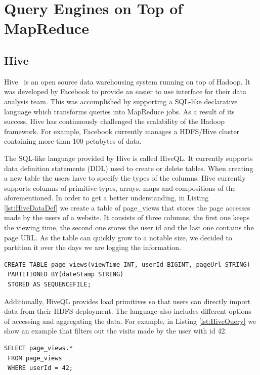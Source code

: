 \documentclass[11pt,a4paper,twoside]{report}
\begin{document}
\section{Query Engines on Top of MapReduce}
\subsection{Hive}
Hive~\cite{Hive} is an open source data warehousing system running on top of Hadoop. It was developed by Facebook to provide an easier to use interface for their data analysis team. This was accomplished by supporting a SQL-like declarative language which transforms queries into MapReduce jobs. As a result of its success, Hive has continuously challenged the scalability of the Hadoop framework. For example, Facebook currently manages a HDFS/Hive cluster containing more than 100 petabytes of data.


The SQL-like language provided by Hive is called HiveQL. It currently supports data definition statements (DDL) used to create or delete tables. When creating a new table the users have to specify the types of the columns. Hive currently supports columns of primitive types, arrays, maps and compositions of the aforementioned. In order to get a better understanding, in Listing \ref{lst:HiveDataDef} we create a table of page\_views that stores the page accesses made by the users of a website. It consists of three columns, the first one keeps the viewing time, the second one stores the user id and the last one contains the page URL. As the table can quickly grow to a notable size, we decided to partition it over the days we are logging the information.\\

\begin{lstlisting}[caption={Example of a Hive Data Definition Statement},
label={lst:HiveDataDef}]
 CREATE TABLE page_views(viewTime INT, userId BIGINT, pageUrl STRING)
 PARTITIONED BY(dateStamp STRING)
 STORED AS SEQUENCEFILE;
\end{lstlisting}


Additionally, HiveQL provides load primitives so that users can directly import data from their HDFS deployment. The language also includes different options of accessing and aggregating the data. For example, in Listing \ref{lst:HiveQuery} we show an example that filters out the visits made by the user with id 42.\\

\begin{lstlisting}[caption={Example of a Hive Query},label={lst:HiveQuery}]
 SELECT page_views.*
 FROM page_views
 WHERE userId = 42;
\end{lstlisting}
\end{document}
